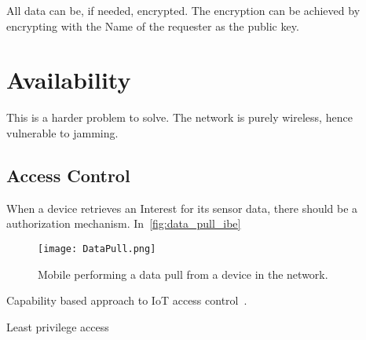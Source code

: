 All data can be, if needed, encrypted.
The encryption can be achieved by encrypting with the Name of the requester as the public key.


\section{Availability}

This is a harder problem to solve.
The network is purely wireless, hence vulnerable to jamming. 

\subsection{Access Control}

When a device retrieves an Interest for its sensor data, there should be a authorization mechanism. 
In~\autoref{fig:data_pull_ibe} 
\begin{figure}[ht]
  \centering
  \texttt{[image: DataPull.png]}
  \caption{Mobile performing a data pull from a device in the network.}
  \label{fig:data_pull_ibe}
\end{figure}


Capability based approach to \gls{IoT} access control~\cite{DBLP:conf/imis/GusmeroliPR12}.

Least privilege access